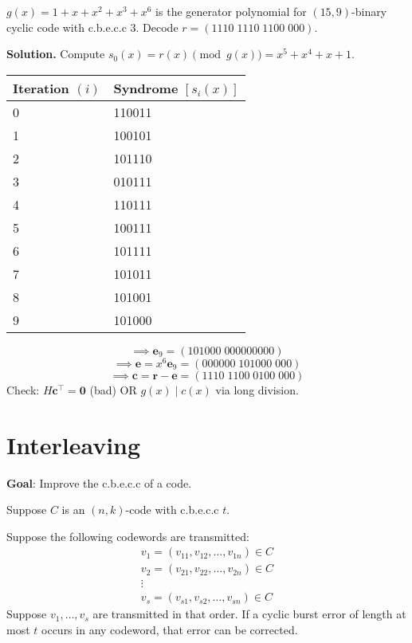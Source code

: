 \begin{Example}{}{}
    $ g(x)=1+x+x^2+x^3+x^6 $ is the generator polynomial for $ (15,9) $-binary
    cyclic code with c.b.e.c.c $ 3 $. Decode $ r=(1110\; 1110\; 1100\; 000) $.

    \textbf{Solution.}
    Compute $ s_0(x)=r(x)\pmod{g(x)}=x^5+x^4+x+1 $.

    \begin{table}[H]
        \centering
        \begin{tabularx}{0.8\linewidth}{@{}YY@{}}
            Iteration $ (i) $ & Syndrome $ [s_i(x)] $ \\
                             & 110011                \\
            1                 & 100101                \\
            2                 & 101110                \\
            3                 & 010111                \\
            4                 & 110111                \\
            5                 & 100111                \\
            6                 & 101111                \\
            7                 & 101011                \\
            8                 & 101001                \\
            9                 & 101000
        \end{tabularx}
    \end{table}

    \[ \implies \bm{e}_9=(101000\; 000000000) \]
    \[ \implies \bm{e}=x^6 \bm{e}_9=(000000\; 101000\;000 ) \]
    \[ \implies \bm{c}=\bm{r}-\bm{e}=(1110\;1100\;0100\;000) \]
    Check: $ H\bm{c}^\top=\bm{0} $ (bad) OR $ g(x)\mid c(x) $ via long division.
\end{Example}

\section{Interleaving}
\textbf{Goal}: Improve the c.b.e.c.c of a code.

Suppose $ C $ is an $ (n,k) $-code with c.b.e.c.c $ t $.

Suppose the following codewords are transmitted:
\[ \begin{array}{c}
        v_1=(v_{11},v_{12},\ldots ,v_{1n})\in C \\
        v_2=(v_{21},v_{22},\ldots ,v_{2n})\in C \\
        \vdots                                  \\
        v_s=(v_{s1},v_{s2},\ldots ,v_{s n})\in C
    \end{array} \]
Suppose $ v_1,\ldots ,v_s $ are transmitted in that order. If a cyclic burst error
of length at most $ t $ occurs in any codeword, that error can be corrected.

